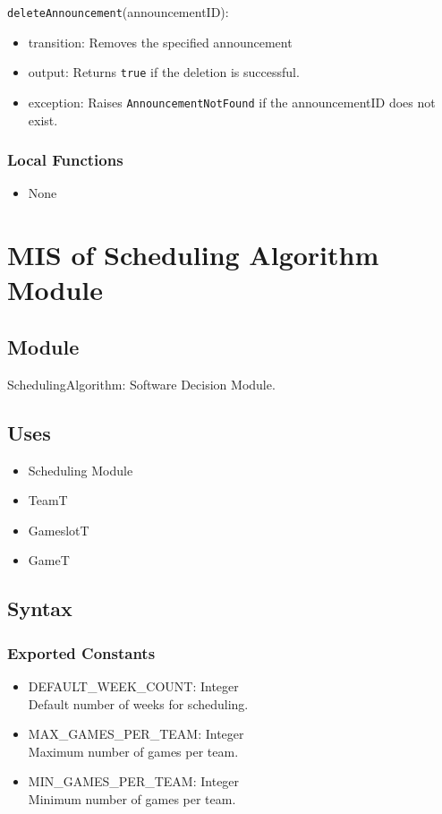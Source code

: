 \documentclass[12pt, titlepage]{article}
\begin{document}
\noindent \texttt{deleteAnnouncement}(announcementID):
\begin{itemize}
  \item transition: Removes the specified announcement
  \item output: Returns \texttt{true} if the deletion is successful.
  \item exception: Raises \texttt{AnnouncementNotFound} if the announcementID does not exist.
\end{itemize}

\subsubsection{Local Functions}
\begin{itemize}
  \item None
\end{itemize}

\newpage

\section{MIS of Scheduling Algorithm Module} \label{SchedulingAlgorithmModule}

\subsection{Module}
SchedulingAlgorithm: Software Decision Module.

\subsection{Uses}
\begin{itemize}
  \item Scheduling Module
  \item TeamT
  \item GameslotT
  \item GameT
\end{itemize}

\subsection{Syntax}

\subsubsection{Exported Constants}
\begin{itemize}
  \item DEFAULT\_WEEK\_COUNT: Integer \\ Default number of weeks for scheduling.
  \item MAX\_GAMES\_PER\_TEAM: Integer \\ Maximum number of games per team.
  \item MIN\_GAMES\_PER\_TEAM: Integer \\ Minimum number of games per team.
\end{itemize}
\end{document}
